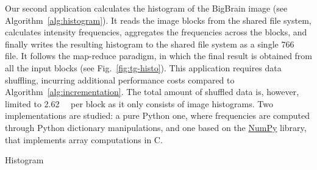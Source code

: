 \documentclass[conference]{IEEEtran}
\begin{document}
 Our second application calculates the histogram of the BigBrain image (see
 Algorithm~\ref{alg:histogram}). It reads the image blocks from the shared
 file system, calculates intensity frequencies, aggregates the frequencies
 across the blocks, and finally writes the resulting histogram to the
 shared file system as a single \SI{766}{\kilo\byte} file. It follows the
 map-reduce paradigm, in which the final result is obtained from all the
 input blocks (see Fig.~\ref{fig:tg-histo}). This application requires data
 shuffling, incurring additional performance costs compared to
 Algorithm~\ref{alg:incrementation}. The total amount of shuffled data is,
 however, limited to \SI{2.62}{\mega\byte} per block as it only consists
 of image histograms. Two implementations are studied: a pure Python one,
 where frequencies are computed through Python dictionary manipulations, and one based
 on the \href{https://github.com/numpy}{NumPy} library, that implements array computations in C.

\begin{algorithm}[!t]
    \caption{Histogram}\label{alg:histogram}
    \begin{algorithmic}
    \EndFor
    

    \end{algorithmic}
\end{algorithm}
\end{document}
